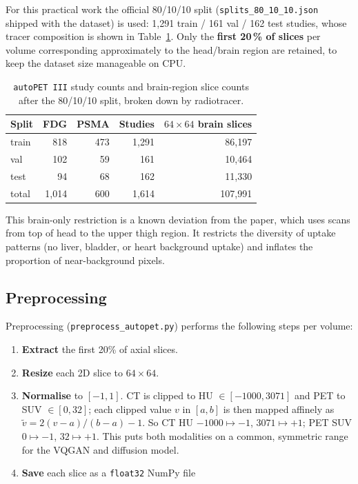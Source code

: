 \documentclass[11pt,a4paper]{article}
\begin{document}
For this practical work the official 80/10/10 split (\texttt{splits\_80\_10\_10.json}
shipped with the dataset) is used: 1{,}291 train / 161 val / 162 test studies, whose
tracer composition is shown in Table~\ref{tab:splits}. Only the \textbf{first 20\,\%
of slices} per volume corresponding approximately to the head/brain region are
retained, to keep the dataset size manageable on CPU.

\begin{table}[h]
\centering
\begin{tabular}{lrrrr}
\toprule
Split & FDG & PSMA & Studies & $64 \times 64$ brain slices \\
\midrule
train & 818 & 473 & 1{,}291 & 86{,}197 \\
val   & 102 & 59  & 161    & 10{,}464 \\
test  & 94  & 68  & 162    & 11{,}330 \\
\midrule
total & 1{,}014 & 600 & 1{,}614 & 107{,}991 \\
\bottomrule
\end{tabular}
\caption{\texttt{autoPET III} study counts and brain-region slice counts after the
80/10/10 split, broken down by radiotracer.}
\label{tab:splits}
\end{table}

This brain-only restriction is a known deviation from the paper, which uses 
scans from top of head to the upper thigh region. It restricts the diversity of 
uptake patterns (no liver, bladder, or heart background uptake) and inflates the proportion 
of near-background pixels.

\subsection{Preprocessing}

Preprocessing (\texttt{preprocess\_autopet.py}) performs the following steps per volume:
\begin{enumerate}
  \item \textbf{Extract} the first 20\% of axial slices.
  \item \textbf{Resize} each 2D slice to $64 \times 64$. 
  \item \textbf{Normalise} to $[-1, 1]$. CT is clipped to HU $\in [-1000, 3071]$ and 
  PET to SUV $\in [0, 32]$; each clipped value $v$ in $[a, b]$ is then mapped affinely 
  as $\tilde v = 2(v-a)/(b-a) - 1$. So CT HU $-1000 \mapsto -1$, $3071 \mapsto +1$; 
  PET SUV $0 \mapsto -1$, $32 \mapsto +1$. This puts both modalities on a common, 
  symmetric range for the VQGAN and diffusion model.
  \item \textbf{Save} each slice as a \texttt{float32} NumPy file
\end{enumerate}
\end{document}
